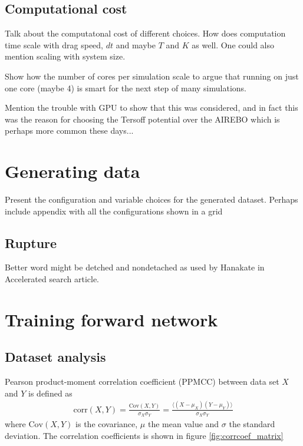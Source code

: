 \section{Computational cost}

Talk about the computatonal cost of different choices. How does computation time scale with drag speed, $dt$ and maybe $T$ and $K$ as well. One could also mention scaling with system size.

Show how the number of cores per simulation scale to argue that running on just one core (maybe 4) is smart for the next step of many simulations. 

Mention the trouble with GPU to show that this was considered, and in fact this was the reason for choosing the Tersoff potential over the AIREBO which is perhaps more common these days...



\chapter{Generating data}

Present the configuration and variable choices for the generated dataset. Perhaps include appendix with all the configurations shown in a grid


\section{Rupture}
Better word might be detched and nondetached as used by Hanakate in Accelerated search article.

\chapter{Training forward network}

\section{Dataset analysis}


Pearson product-moment correlation coefficient (PPMCC) between data set $X$ and $Y$ is defined as
\begin{align*}
  \mathrm{corr}(X,Y) = \frac{\mathrm{Cov}(X,Y)}{\sigma_X \sigma_Y} = \frac{\langle (X - \mu_X)(Y - \mu_Y)\rangle}{\sigma_X \sigma_Y}
\end{align*}
where $\mathrm{Cov}(X,Y)$ is the covariance, $\mu$ the mean value and $\sigma$ the standard deviation. The correlation coefficients is shown in figure \ref{fig:corrcoef_matrix}

